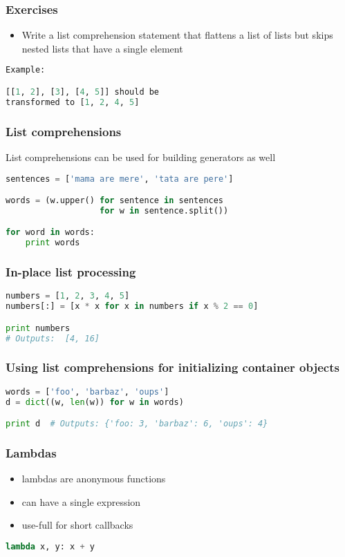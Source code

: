\documentclass{beamer}
\begin{document}
\begin{frame}[fragile]
\frametitle{Exercises}
\begin{itemize}
  \item Write a list comprehension statement that flattens a list of lists but
    skips nested lists that have a single element
\end{itemize}

\begin{lstlisting}[language=python]
Example:

[[1, 2], [3], [4, 5]] should be
transformed to [1, 2, 4, 5]
\end{lstlisting}
\end{frame}


\begin{frame}[fragile]
\frametitle{List comprehensions}
List comprehensions can be used for building generators as well
\begin{lstlisting}[language=python]
sentences = ['mama are mere', 'tata are pere']

words = (w.upper() for sentence in sentences
                   for w in sentence.split())

for word in words:
    print words
\end{lstlisting}
\end{frame}


\begin{frame}[fragile]
\frametitle{In-place list processing}
\begin{lstlisting}[language=python]
numbers = [1, 2, 3, 4, 5]
numbers[:] = [x * x for x in numbers if x % 2 == 0]

print numbers
# Outputs:  [4, 16]
\end{lstlisting}
\end{frame}

\begin{frame}[fragile]
\frametitle{Using list comprehensions for initializing container objects}
\begin{lstlisting}[language=python]
words = ['foo', 'barbaz', 'oups']
d = dict((w, len(w)) for w in words)

print d  # Outputs: {'foo: 3, 'barbaz': 6, 'oups': 4}
\end{lstlisting}
\end{frame}


\begin{frame}[fragile]
\frametitle{Lambdas}
\begin{itemize}
  \item lambdas are anonymous functions
  \item can have a single expression
  \item use-full for short callbacks
\end{itemize}
\begin{lstlisting}[language=python]
lambda x, y: x + y
\end{lstlisting}
\end{frame}
\end{document}
